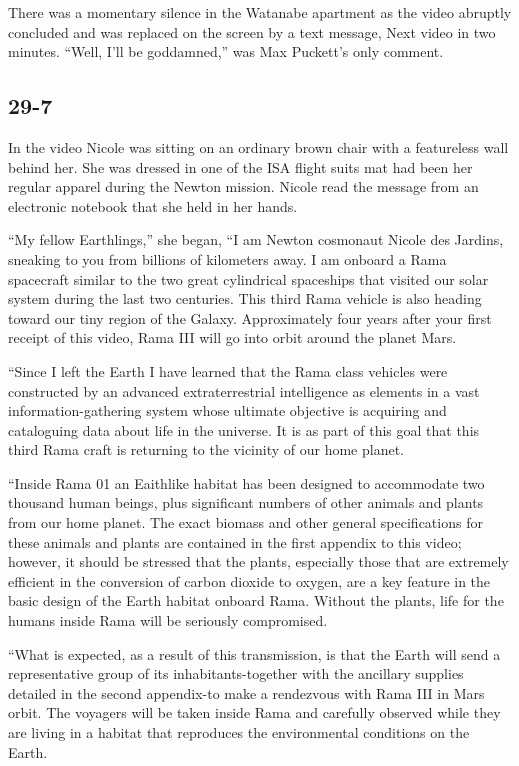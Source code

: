 \documentclass[]{article}
\begin{document}
{There was a momentary silence in the Watanabe apartment as the video abruptly concluded and was replaced on the screen by a text message, Next video in two minutes. “Well, I’ll be goddamned,” was Max Puckett’s only comment.



\subsection{29-7}

In the video Nicole was sitting on an ordinary brown chair with a featureless wall behind her. She was dressed in one of the ISA flight suits mat had been her regular apparel during the Newton mission. Nicole read the message from an electronic notebook that she held in her hands.

“My fellow Earthlings,” she began, “I am Newton cosmonaut Nicole des Jardins, sneaking to you from billions of kilometers away. I am onboard a Rama spacecraft similar to the two great cylindrical spaceships that visited our solar system during the last two centuries. This third Rama vehicle is also heading toward our tiny region of the Galaxy. Approximately four years after your first receipt of this video, Rama III will go into orbit around the planet Mars.

“Since I left the Earth I have learned that the Rama class vehicles were constructed by an advanced extraterrestrial intelligence as elements in a vast information-gathering system whose ultimate objective is acquiring and cataloguing data about life in the universe. It is as part of this goal that this third Rama craft is returning to the vicinity of our home planet.

“Inside Rama 01 an Eaithlike habitat has been designed to accommodate two thousand human beings, plus significant numbers of other animals and plants from our home planet. The exact biomass and other general specifications for these animals and plants are contained in the first appendix to this video; however, it should be stressed that the plants, especially those that are extremely efficient in the conversion of carbon dioxide to oxygen, are a key feature in the basic design of the Earth habitat onboard Rama. Without the plants, life for the humans inside Rama will be seriously compromised.

“What is expected, as a result of this transmission, is that the Earth will send a representative group of its inhabitants-together with the ancillary supplies detailed in the second appendix-to make a rendezvous with Rama III in Mars orbit. The voyagers will be taken inside Rama and carefully observed while they are living in a habitat that reproduces the environmental conditions on the Earth.

}
\end{document}
